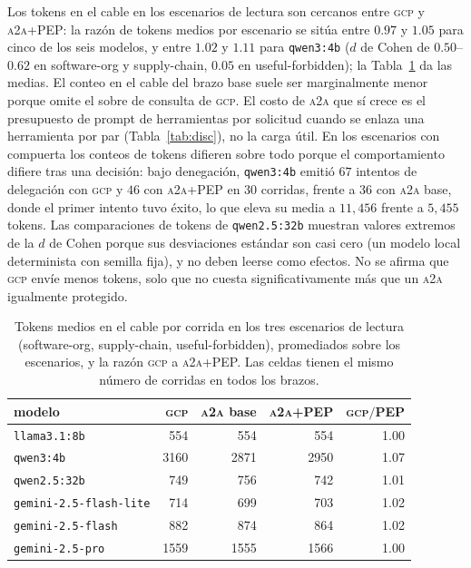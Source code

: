 \documentclass[conference,letterpaper]{IEEEtran}
\newcommand{\gcp}{\textsc{gcp}}
\newcommand{\ata}{\textsc{a2a}}
\begin{document}
Los tokens en el cable en los escenarios de lectura son cercanos entre \gcp{} y \ata{}+PEP: la razón de
tokens medios por escenario se sitúa entre $0.97$ y $1.05$ para cinco de los seis modelos, y entre $1.02$ y $1.11$
para \texttt{qwen3:4b} ($d$ de Cohen de $0.50$--$0.62$ en software-org y supply-chain, $0.05$ en
useful-forbidden); la Tabla~\ref{tab:tokens} da las medias. El conteo en
el cable del brazo base suele ser marginalmente menor porque omite el sobre de consulta de \gcp{}. El
costo de \ata{} que sí crece es el presupuesto de prompt de herramientas por solicitud cuando se enlaza
una herramienta por par (Tabla~\ref{tab:disc}), no la carga útil. En los escenarios con compuerta los
conteos de tokens difieren sobre todo porque el comportamiento difiere tras una decisión: bajo
denegación, \texttt{qwen3:4b} emitió $67$ intentos de delegación con \gcp{} y $46$ con \ata{}+PEP en
$30$ corridas, frente a $36$ con \ata{} base, donde el primer intento tuvo éxito, lo que eleva su media
a $11{,}456$ frente a $5{,}455$ tokens. Las comparaciones de tokens de \texttt{qwen2.5:32b} muestran
valores extremos de la $d$ de Cohen porque sus desviaciones estándar son casi cero (un modelo local
determinista con semilla fija), y no deben leerse como efectos. No se afirma que \gcp{} envíe menos
tokens, solo que no cuesta significativamente más que un \ata{} igualmente protegido.

\begin{table}[t]
\centering
\caption{Tokens medios en el cable por corrida en los tres escenarios de lectura (software-org,
supply-chain, useful-forbidden), promediados sobre los escenarios, y la raz\'on \gcp{} a \ata{}+PEP. Las
celdas tienen el mismo n\'umero de corridas en todos los brazos.}
\label{tab:tokens}
\footnotesize
\setlength{\tabcolsep}{3pt}
\begin{tabular}{lrrrr}
\toprule
modelo & \gcp{} & \ata{} base & \ata{}+PEP & \gcp{}$/$PEP \\
\midrule
\texttt{llama3.1:8b} & 554 & 554 & 554 & 1.00 \\
\texttt{qwen3:4b} & 3160 & 2871 & 2950 & 1.07 \\
\texttt{qwen2.5:32b} & 749 & 756 & 742 & 1.01 \\
\texttt{gemini-2.5-flash-lite} & 714 & 699 & 703 & 1.02 \\
\texttt{gemini-2.5-flash} & 882 & 874 & 864 & 1.02 \\
\texttt{gemini-2.5-pro} & 1559 & 1555 & 1566 & 1.00 \\
\bottomrule
\end{tabular}
\end{table}
\end{document}
